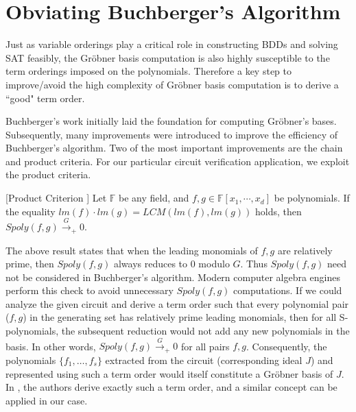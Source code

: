 \section{Obviating Buchberger's Algorithm}
\label{sec:improv}

Just as variable orderings play a critical role in constructing BDDs
and solving SAT feasibly,  the Gr\"obner basis computation is also
highly susceptible to the term orderings imposed on the polynomials. 
Therefore a key step to improve/avoid the high complexity 
of Gr\"obner basis computation is to derive a ``good" term order.

Buchberger's work \cite{buchberger_thesis} initially laid the
foundation for computing Gr\"obner's bases.  Subsequently, many
improvements were introduced to improve the efficiency of Buchberger's
algorithm. Two of the most important improvements are the chain and
product criteria. For our particular circuit verification application,
we exploit the product criteria. 


\begin{Lemma}
\label{lemma:prodcriteria}
[Product Criterion \cite{productc:1979}] Let $\mathbb{F}$ be any
field, and $f, g \in \mathbb{F}[x_1,\cdots,x_d]$ be polynomials. If
the equality $lm(f) \cdot lm(g) = LCM(lm(f), lm(g))$ holds, then
$Spoly(f,g)\stackrel{G}{\textstyle\longrightarrow}_+ 0.$ 
\end{Lemma}

The above result states that when the leading monomials of $f, g$ are
relatively prime, then $Spoly(f, g)$ always reduces to 0 modulo $G$. Thus
$Spoly(f, g)$ need not be considered in Buchberger's algorithm. 
Modern computer algebra engines perform this check to avoid
unnecessary $Spoly(f, g)$ computations.  If we could analyze the given
circuit and  derive a term order such that every polynomial pair
($f,g$) in the generating set has relatively prime leading monomials,
then for all S-polynomials, the subsequent reduction would not add any
new polynomials in the basis. In other words, $Spoly(f, g)
\stackrel{G}{\textstyle\longrightarrow}_+ 0$ for all pairs $f,
g$. Consequently, the polynomials $\{f_1, \dots, f_s\}$ extracted from
the circuit (corresponding ideal $J$) and represented using such a
term order would itself constitute a Gr\"obner basis of $J$.  In
\cite{wienand:cav08}, the authors derive exactly such a term order,
and a similar concept can be applied in our case. 

